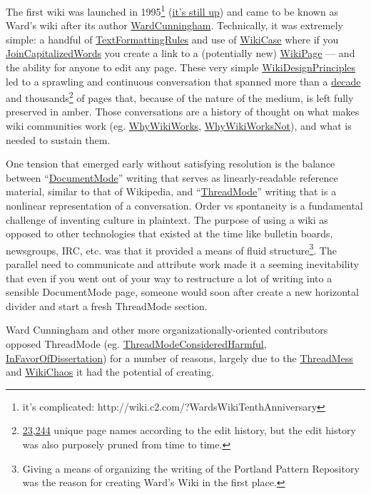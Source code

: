 The first wiki was launched in 1995\footnote{it's complicated:
  http://wiki.c2.com/?WardsWikiTenthAnniversary}
(\href{http://wiki.c2.com/}{it's still up}) and came to be known as
Ward's wiki after its author
\href{http://wiki.c2.com/?WardCunningham}{WardCunningham}. Technically,
it was extremely simple: a handful of
\href{http://wiki.c2.com/?TextFormattingRules}{TextFormattingRules} and
use of \href{http://wiki.c2.com/?WikiCase}{WikiCase} where if you
\href{http://wiki.c2.com/?JoinCapitalizedWords}{JoinCapitalizedWords}
you create a link to a (potentially new)
\href{http://wiki.c2.com/?WikiPage}{WikiPage} --- and the ability for
anyone to edit any page. These very simple
\href{http://wiki.c2.com/?WikiDesignPrinciples}{WikiDesignPrinciples}
led to a sprawling and continuous conversation that spanned more than a
\href{http://wiki.c2.com/?WardsWikiTenthAnniversary}{decade} and
thousands\footnote{\href{http://c2.com/wiki/history/}{23,244} unique
  page names according to the edit history, but the edit history was
  also purposely pruned from time to time.} of pages that, because of
the nature of the medium, is left fully preserved in amber. Those
conversations are a history of thought on what makes wiki communities
work (eg. \href{http://wiki.c2.com/?WhyWikiWorks}{WhyWikiWorks},
\href{http://wiki.c2.com/?WhyWikiWorksNot}{WhyWikiWorksNot}), and what
is needed to sustain them.

One tension that emerged early without satisfying resolution is the
balance between
``\href{http://wiki.c2.com/?DocumentMode}{DocumentMode}'' writing that
serves as linearly-readable reference material, similar to that of
Wikipedia, and ``\href{http://wiki.c2.com/?ThreadMode}{ThreadMode}''
writing that is a nonlinear representation of a conversation. Order vs
spontaneity is a fundamental challenge of inventing culture in
plaintext. The purpose of using a wiki as opposed to other technologies
that existed at the time like bulletin boards, newsgroups, IRC, etc. was
that it provided a means of fluid structure\footnote{Giving a means of
  organizing the writing of the Portland Pattern Repository was the
  reason for creating Ward's Wiki in the first place.}. The parallel
need to communicate and attribute work made it a seeming inevitability
that even if you went out of your way to restructure a lot of writing
into a sensible DocumentMode page, someone would soon after create a new
horizontal divider and start a fresh ThreadMode section.

Ward Cunningham and other more organizationally-oriented contributors
opposed ThreadMode (eg.
\href{http://wiki.c2.com/?ThreadModeConsideredHarmful}{ThreadModeConsideredHarmful},
\href{http://wiki.c2.com/?InFavorOfDissertation}{InFavorOfDissertation})
for a number of reasons, largely due to the
\href{http://wiki.c2.com/?ThreadMess}{ThreadMess} and
\href{http://wiki.c2.com/?WikiChaos}{WikiChaos} it had the potential of
creating.

